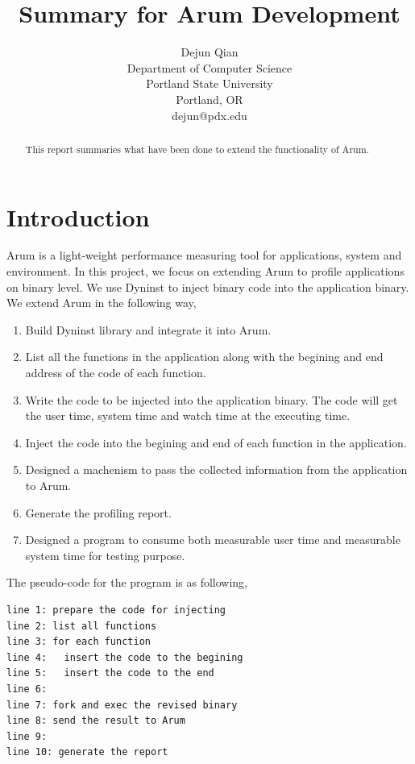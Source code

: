 \documentclass[11pt,letterpaper,oneside]{article}
\title{Summary for Arum Development}
\author{Dejun Qian\\Department of Computer Science\\Portland State University\\Portland, OR\\dejun@pdx.edu}
\begin{document}
\maketitle

\begin{abstract}
This report summaries what have been done to extend the functionality of Arum.
\end{abstract}

\section{Introduction}
Arum is a light-weight performance measuring tool for applications, system and environment. In this project, we focus on extending Arum to profile applications on binary level. We use Dyninst to inject binary code into the application binary. We extend Arum in the following way,
\begin{enumerate}
\item Build Dyninst library and integrate it into Arum.
\item List all the functions in the application along with the begining and end address of the code of each function.
\item Write the code to be injected into the application binary. The code will get the user time, system time and watch time at the executing time.
\item Inject the code into the begining and end of each function in the application.
\item Designed a machenism to pass the collected information from the application to Arum.
\item Generate the profiling report.
\item Designed a program to consume both measurable user time and measurable system time for testing purpose.
\end{enumerate}

The pseudo-code for the program is as following,
\begin{Verbatim}[frame=single]
line 1: prepare the code for injecting
line 2: list all functions
line 3: for each function
line 4:   insert the code to the begining
line 5:   insert the code to the end
line 6:
line 7: fork and exec the revised binary
line 8: send the result to Arum
line 9: 
line 10: generate the report
\end{Verbatim}
\end{document}
